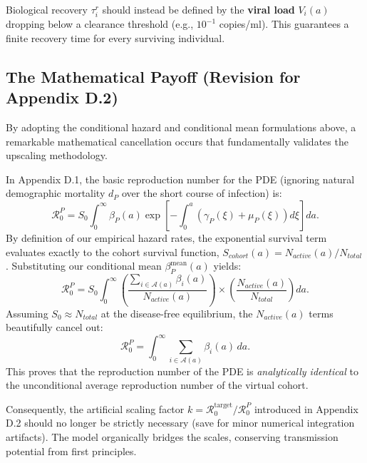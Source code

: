 \documentclass[11pt]{article}
\begin{document}
Biological recovery $\tau_i^r$ should instead be defined by the \textbf{viral load} $V_i(a)$ dropping below a clearance threshold (e.g., $10^{-1}$ copies/ml). This guarantees a finite recovery time for every surviving individual.

\subsection{The Mathematical Payoff (Revision for Appendix D.2)}

By adopting the conditional hazard and conditional mean formulations above, a remarkable mathematical cancellation occurs that fundamentally validates the upscaling methodology. 

In Appendix D.1, the basic reproduction number for the PDE (ignoring natural demographic mortality $d_P$ over the short course of infection) is:
\begin{equation}
    \mathcal{R}_0^P = S_0 \int_0^\infty \beta_P(a) \exp\left[-\int_0^a (\gamma_P(\xi) + \mu_P(\xi)) d\xi \right] da.
\end{equation}
By definition of our empirical hazard rates, the exponential survival term evaluates exactly to the cohort survival function, $S_{cohort}(a) = N_{active}(a) / N_{total}$. Substituting our conditional mean $\beta_P^{\text{mean}}(a)$ yields:
\begin{equation}
    \mathcal{R}_0^P = S_0 \int_0^\infty \left( \frac{\sum_{i \in \mathcal{A}(a)} \beta_i(a)}{N_{active}(a)} \right) \times \left( \frac{N_{active}(a)}{N_{total}} \right) da.
\end{equation}
Assuming $S_0 \approx N_{total}$ at the disease-free equilibrium, the $N_{active}(a)$ terms beautifully cancel out:
\begin{equation}
    \mathcal{R}_0^P = \int_0^\infty \sum_{i \in \mathcal{A}(a)} \beta_i(a) \, da.
\end{equation}
This proves that the reproduction number of the PDE is \textit{analytically identical} to the unconditional average reproduction number of the virtual cohort. 

Consequently, the artificial scaling factor $k = \mathcal{R}_0^{\text{target}} / \mathcal{R}_0^P$ introduced in Appendix D.2 should no longer be strictly necessary (save for minor numerical integration artifacts). The model organically bridges the scales, conserving transmission potential from first principles.
\end{document}
